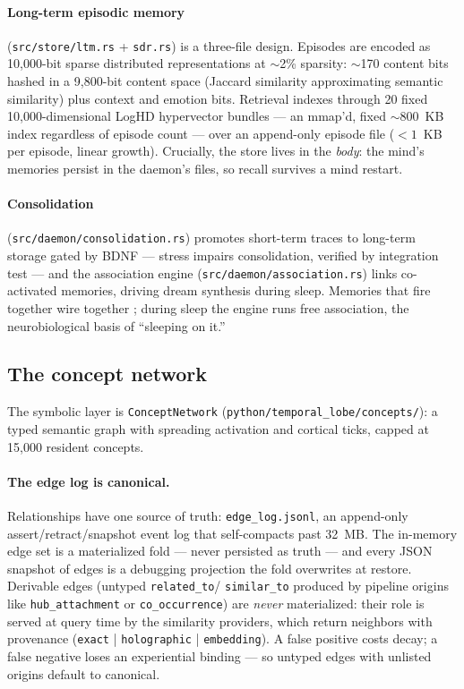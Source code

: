 \documentclass[11pt]{article}
\newcommand{\code}[1]{\texttt{\small #1}}
\begin{document}
\paragraph{Long-term episodic memory} (\code{src/store/ltm.rs} +
\code{sdr.rs}) is a three-file design. Episodes are encoded as
10{,}000-bit sparse distributed representations at $\sim$2\% sparsity:
$\sim$170 content bits hashed in a 9{,}800-bit content space (Jaccard
similarity approximating semantic similarity) plus context and emotion
bits. Retrieval indexes through 20 fixed 10{,}000-dimensional LogHD
hypervector bundles --- an mmap'd, fixed $\sim$800~KB index regardless
of episode count --- over an append-only episode file ($<1$~KB per
episode, linear growth). Crucially, the store lives in the \emph{body}:
the mind's memories persist in the daemon's files, so recall survives a
mind restart.

\paragraph{Consolidation} (\code{src/daemon/consolidation.rs}) promotes
short-term traces to long-term storage gated by BDNF --- stress impairs
consolidation, verified by integration test --- and the association
engine (\code{src/daemon/association.rs}) links co-activated memories,
driving dream synthesis during sleep. Memories that fire together wire
together \cite{hebb}; during sleep the engine runs free association, the
neurobiological basis of ``sleeping on it.''

\subsection{The concept network}

The symbolic layer is \code{ConceptNetwork}
(\code{python/temporal\_lobe/concepts/}): a typed semantic graph with
spreading activation and cortical ticks, capped at 15{,}000 resident
concepts.

\paragraph{The edge log is canonical.} Relationships have one source of
truth: \code{edge\_log.jsonl}, an append-only assert/retract/snapshot
event log that self-compacts past 32~MB. The in-memory edge set is a
materialized fold --- never persisted as truth --- and every JSON
snapshot of edges is a debugging projection the fold overwrites at
restore. Derivable edges (untyped \code{related\_to}/
\code{similar\_to} produced by pipeline origins like
\code{hub\_attachment} or \code{co\_occurrence}) are \emph{never}
materialized: their role is served at query time by the similarity
providers, which return neighbors with provenance (\code{exact} |
\code{holographic} | \code{embedding}). A false positive costs decay; a
false negative loses an experiential binding --- so untyped edges with
unlisted origins default to canonical.
\end{document}
